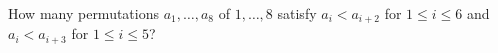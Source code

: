 How many permutations $a_1,\ldots,a_8$ of $1,\ldots,8$ satisfy $a_i<a_{i+2}$ for $1\le i\le6$ and $a_i<a_{i+3}$ for $1\le i\le5$?
